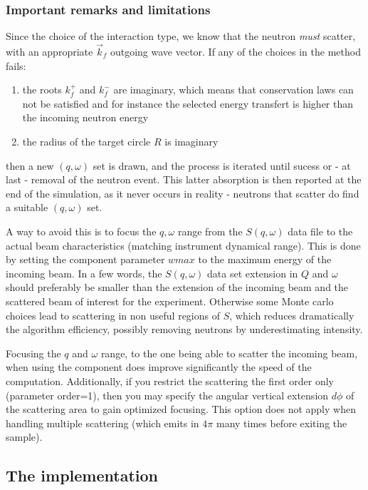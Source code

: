 \subsubsection{Important remarks and limitations}

Since the choice of the interaction type, we know that the neutron \emph{must} scatter, with an appropriate $\vec k_f$ outgoing wave vector. If any of the choices in the method fails:
\begin{enumerate}
\item the roots $k_f^+$ and $k_f^-$ are imaginary, which means that conservation laws can not be satisfied and for instance the selected energy transfert is higher than the incoming neutron energy
\item the radius of the target circle $R$ is imaginary
\end{enumerate}
then a new $(q, \omega)$ set is drawn, and the process is iterated until sucess or - at last - removal of the neutron event. This latter absorption is then reported at the end of the simulation, as it never occurs in reality - neutrons that scatter do find a suitable $(q, \omega)$ set.

A way to avoid this is to focus the $q,\omega$ range from the $S(q, \omega)$ data file to the actual beam characteristics (matching instrument dynamical range). This is done by setting the component parameter $wmax$ to the maximum energy of the incoming beam. In a few words, the $S(q,\omega)$ data set extension in $Q$ and $\omega$ should preferably be smaller than the extension of the incoming beam and the scattered beam of interest for the experiment. Otherwise some Monte carlo choices lead to scattering in non useful regions of $S$, which reduces dramatically the algorithm efficiency, possibly removing neutrons by underestimating intensity.

Focusing the $q$ and $\omega$ range, to the one being able to scatter the incoming beam, when using the component does improve significantly the speed of the computation. Additionally, if you restrict the scattering the first order only (parameter order=1), then you may specify the angular vertical extension $d\phi$ of the scattering area to gain optimized focusing. This option does not apply when handling multiple scattering (which emits in $4\pi$ many times before exiting the sample).

\subsection{The implementation}

